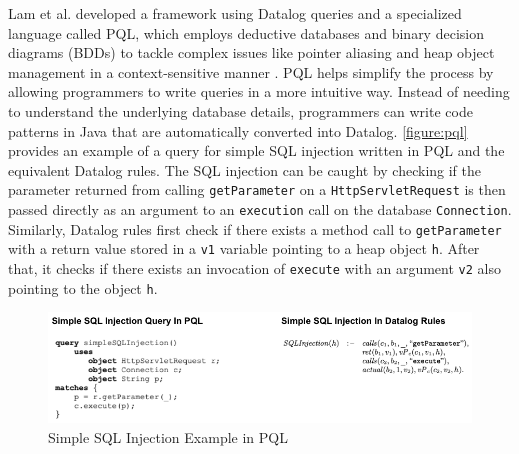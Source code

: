 Lam et al. developed a framework using Datalog queries and a specialized language called PQL, which employs deductive databases and binary decision diagrams (BDDs) to tackle complex issues like pointer aliasing and heap object management in a context-sensitive manner \cite{Lam2005}. PQL helps simplify the process by allowing programmers to write queries in a more intuitive way. Instead of needing to understand the underlying database details, programmers can write code patterns in Java that are automatically converted into Datalog. \autoref{figure:pql} provides an example of a query for simple SQL injection written in PQL and the equivalent Datalog rules. The SQL injection can be caught by checking if the parameter returned from calling \texttt{getParameter} on a \texttt{HttpServletRequest} is then passed directly as an argument to an \texttt{execution} call on the database \texttt{Connection}. Similarly, Datalog rules first check if there exists a method call to \texttt{getParameter} with a return value stored in a \texttt{v1} variable pointing to a heap object \texttt{h}. After that, it checks if there exists an invocation of \texttt{execute} with an argument \texttt{v2} also pointing to the object \texttt{h}.

\begin{figure}[h]
    \centering
    \includegraphics[width=1\textwidth]{Packages/PQL.png}
    \caption{Simple SQL Injection Example in PQL \cite{Lam2005}}
    \label{figure:pql}
\end{figure}

\newpage
